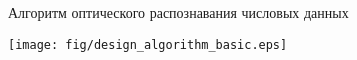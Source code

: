\documentclass[russian,utf8,a1paper,nostitching,simple]{eskdgraph}
\begin{document}
\begin{ESKDdrawing}
  \centering
  {\fontsize{50}{60}\selectfont Алгоритм оптического распознавания числовых данных}

  \vspace{2cm}
  \centering
  \texttt{[image: fig/design\_algorithm\_basic.eps]}

\end{ESKDdrawing}

\setcounter{page}{1}
\begin{ESKDdrawing}
\end{ESKDdrawing}
\end{document}
